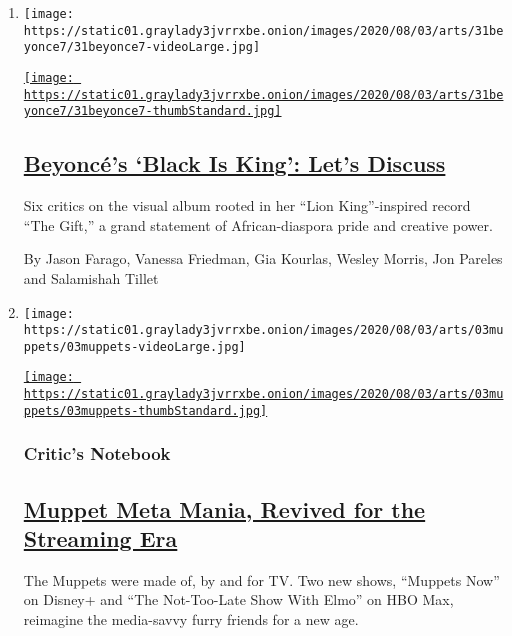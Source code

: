 \begin{enumerate}
\def\labelenumi{\arabic{enumi}.}
\item
  \texttt{[image: https://static01.graylady3jvrrxbe.onion/images/2020/08/03/arts/31beyonce7/31beyonce7-videoLarge.jpg]}

  \href{/2020/07/31/arts/music/beyonce-black-is-king.html}{\texttt{[image: https://static01.graylady3jvrrxbe.onion/images/2020/08/03/arts/31beyonce7/31beyonce7-thumbStandard.jpg]}}

  \hypertarget{beyoncuxe9s-black-is-king-lets-discuss}{%
  \subsection{\texorpdfstring{\href{/2020/07/31/arts/music/beyonce-black-is-king.html}{Beyoncé's
  `Black Is King': Let's
  Discuss}}{Beyoncé's `Black Is King': Let's Discuss}}\label{beyoncuxe9s-black-is-king-lets-discuss}}

  Six critics on the visual album rooted in her ``Lion King''-inspired
  record ``The Gift,'' a grand statement of African-diaspora pride and
  creative power.

  By Jason Farago, Vanessa Friedman, Gia Kourlas, Wesley Morris, Jon
  Pareles and Salamishah Tillet
\item
  \texttt{[image: https://static01.graylady3jvrrxbe.onion/images/2020/08/03/arts/03muppets/03muppets-videoLarge.jpg]}

  \href{/2020/07/31/arts/television/muppets-now.html}{\texttt{[image: https://static01.graylady3jvrrxbe.onion/images/2020/08/03/arts/03muppets/03muppets-thumbStandard.jpg]}}

  \hypertarget{critics-notebook}{%
  \subsubsection{Critic's Notebook}\label{critics-notebook}}

  \hypertarget{muppet-meta-mania-revived-for-the-streaming-era}{%
  \subsection{\texorpdfstring{\href{/2020/07/31/arts/television/muppets-now.html}{Muppet
  Meta Mania, Revived for the Streaming
  Era}}{Muppet Meta Mania, Revived for the Streaming Era}}\label{muppet-meta-mania-revived-for-the-streaming-era}}

  The Muppets were made of, by and for TV. Two new shows, ``Muppets
  Now'' on Disney+ and ``The Not-Too-Late Show With Elmo'' on HBO Max,
  reimagine the media-savvy furry friends for a new age.


\end{enumerate}
